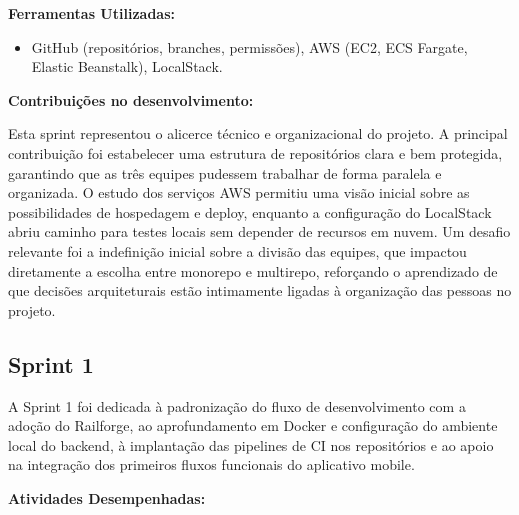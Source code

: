 \textbf{Ferramentas Utilizadas:}

\begin{itemize}
\item
  GitHub (repositórios, branches, permissões), AWS (EC2, ECS Fargate,
  Elastic Beanstalk), LocalStack.
\end{itemize}

\textbf{Contribuições no desenvolvimento:}

Esta sprint representou o alicerce técnico e organizacional do projeto.
A principal contribuição foi estabelecer uma estrutura de repositórios
clara e bem protegida, garantindo que as três equipes pudessem trabalhar
de forma paralela e organizada. O estudo dos serviços AWS permitiu uma
visão inicial sobre as possibilidades de hospedagem e deploy, enquanto a
configuração do LocalStack abriu caminho para testes locais sem depender
de recursos em nuvem. Um desafio relevante foi a indefinição inicial
sobre a divisão das equipes, que impactou diretamente a escolha entre
monorepo e multirepo, reforçando o aprendizado de que decisões
arquiteturais estão intimamente ligadas à organização das pessoas no
projeto.

\subsection{Sprint 1}

A Sprint 1 foi dedicada à padronização do fluxo de desenvolvimento com a
adoção do Railforge, ao aprofundamento em Docker e configuração do
ambiente local do backend, à implantação das pipelines de CI nos
repositórios e ao apoio na integração dos primeiros fluxos funcionais do
aplicativo mobile.

\textbf{Atividades Desempenhadas:}

